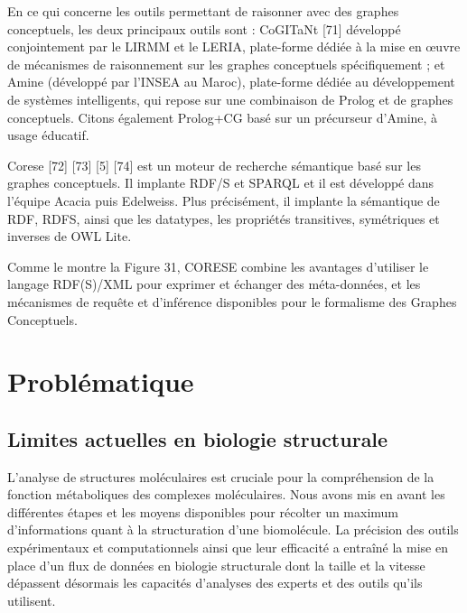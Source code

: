 En ce qui concerne les outils permettant de raisonner avec des graphes conceptuels, les deux principaux outils sont : CoGITaNt [71] développé conjointement par le LIRMM et le LERIA, plate-forme dédiée à la mise en œuvre de mécanismes de raisonnement sur les graphes conceptuels spécifiquement ; et Amine (développé par l'INSEA au Maroc), plate-forme dédiée au développement de systèmes intelligents, qui repose sur une combinaison de Prolog et de graphes conceptuels. Citons également Prolog+CG basé sur un précurseur d'Amine, à usage éducatif.

Corese [72] [73] [5] [74] est un moteur de recherche sémantique basé sur les graphes conceptuels. Il implante RDF/S et SPARQL et il est développé dans l’équipe Acacia puis Edelweiss. Plus précisément, il implante la sémantique de RDF, RDFS, ainsi que les datatypes, les propriétés transitives, symétriques et inverses de OWL Lite.

Comme le montre la Figure 31, CORESE combine les avantages d'utiliser le langage RDF(S)/XML pour exprimer et échanger des méta-données, et les mécanismes de requête et d'inférence disponibles pour le formalisme des Graphes Conceptuels.

\section{Problématique}

\subsection{Limites actuelles en biologie structurale}

L'analyse de structures moléculaires est cruciale pour la compréhension de la fonction métaboliques des complexes moléculaires. Nous avons mis en avant les différentes étapes et les moyens disponibles pour récolter un maximum d'informations quant à la structuration d'une biomolécule. La précision des outils expérimentaux et computationnels ainsi que leur efficacité a entraîné la mise en place d'un flux de données en biologie structurale dont la taille et la vitesse dépassent désormais les capacités d'analyses des experts et des outils qu'ils utilisent. 

